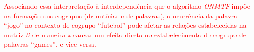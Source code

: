 \documentclass[
    12pt,                %
    oneside,            %
    a4paper,            %
    english,            %
    brazil                %
    ]{abntex2ppgsi}
\begin{document}
\textcolor{red}{Associando essa interpretação à interdependência que o algoritmo \textit{ONMTF} impõe na formação dos cogrupos (de notícias e de palavras), a ocorrência da palavra ``jogo'' no contexto do cogrupo ``futebol'' pode afetar as relações estabelecidas na matriz $S$ de maneira a causar um efeito direto no estabelecimento do cogrupo de palavras ``games'', e vice-versa.}


\end{document}
